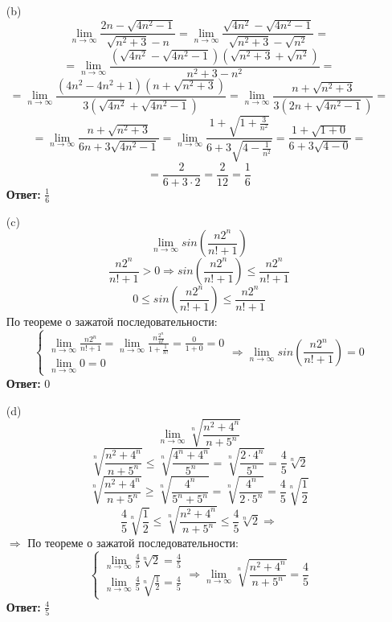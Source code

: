 \documentclass[a4paper]{article}
\renewcommand{\f}[2]{\frac{#1}{#2}}
\renewcommand{\r}{\Rightarrow}
\renewcommand{\geq}{\geqslant}
\renewcommand{\leq}{\leqslant}
\begin{document}
\begin{enumerate}
\begin{enumerate}
        \item[(b)]
        $$\lim_{n \to \infty}{\f{2n-\sqrt{4n^2-1}}{\sqrt{n^2+3}-n}} = \lim_{n \to \infty}{\f{\sqrt{4n^2}-\sqrt{4n^2-1}}{\sqrt{n^2+3}-\sqrt{n^2}}} = $$
        $$=\lim_{n \to \infty}{\f{(\sqrt{4n^2}-\sqrt{4n^2-1})(\sqrt{n^2+3}+\sqrt{n^2})}{n^2+3-n^2}} = $$
        $$=\lim_{n \to \infty}{\f{(4n^2-4n^2+1)(n+\sqrt{n^2+3})}{3(\sqrt{4n^2}+\sqrt{4n^2-1})}}=\lim_{n \to \infty}{\f{n+\sqrt{n^2+3}}{3(2n+\sqrt{4n^2-1})}} = $$
        $$=\lim_{n \to \infty}{\f{n+\sqrt{n^2+3}}{6n+3\sqrt{4n^2-1}}} = \lim_{n \to \infty}{\f{1+\sqrt{1+\f{3}{n^2}}}{6+3\sqrt{4-\f{1}{n^2}}}} = \f{1+\sqrt{1+0}}{6+3\sqrt{4-0}} =$$
        $$=\f{2}{6+3\cdot 2}=\f{2}{12}=\f{1}{6}$$
        \textbf{Ответ:} $\f{1}{6}$

        \item[(c)]
        $$\lim_{n\to \infty}sin(\f{n2^n}{n!+1})$$
        $$\f{n2^n}{n!+1}>0 \r sin(\f{n2^n}{n!+1}) \leq \f{n2^n}{n!+1}$$
        $$0 \leq sin(\f{n2^n}{n!+1}) \leq \f{n2^n}{n!+1}$$
        По теореме о зажатой последовательности:
        $$\begin{cases}
            \lim_{n \to \infty} \f{n2^n}{n!+1} = \lim_{n \to \infty} \f{n\f{2^n}{n!}}{1+\f{1}{n!}} = \f{0}{1+0}  = 0\\
            \lim_{n \to \infty} 0 = 0
        \end{cases}\r \lim_{n\to \infty}sin(\f{n2^n}{n!+1}) = 0 $$
        \textbf{Ответ:} $0$

        \item[(d)]
        $$\lim_{n \to \infty}\sqrt[n]{\f{n^2+4^n}{n+5^n}}$$
        $$\sqrt[n]{\f{n^2+4^n}{n+5^n}} \leq \sqrt[n]{\f{4^n+4^n}{5^n}} = \sqrt[n]{\f{2\cdot 4^n}{5^n}} = \f{4}{5}\sqrt[n]{2}$$
        $$\sqrt[n]{\f{n^2+4^n}{n+5^n}} \geq \sqrt[n]{\f{4^n}{5^n+5^n}} = \sqrt[n]{\f{4^n}{2\cdot 5^n}} = \f{4}{5}\sqrt[n]{\f{1}{2}}$$
        $$\f{4}{5}\sqrt[n]{\f{1}{2}} \leq \sqrt[n]{\f{n^2+4^n}{n+5^n}} \leq \f{4}{5}\sqrt[n]{2} \r $$
        $\r$ По теореме о зажатой последовательности:
        $$\begin{cases}
            \lim_{n \to \infty}\f{4}{5}\sqrt[n]{2} = \f{4}{5}\\
            \lim_{n \to \infty}\f{4}{5}\sqrt[n]{\f{1}{2}} = \f{4}{5}
        \end{cases} \r \lim_{n \to \infty}\sqrt[n]{\f{n^2+4^n}{n+5^n}} = \f{4}{5}$$
        \textbf{Ответ: } $\f{4}{5}$


\end{enumerate}
\end{enumerate}
\end{document}

